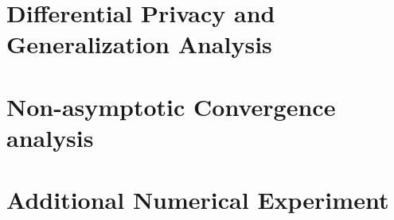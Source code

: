 %

\section{Differential Privacy and Generalization Analysis} \label{sec: pri}



\vspace{0.2in}

\section{Non-asymptotic Convergence analysis}


\vspace{0.2in}

\section{Additional Numerical Experiment}


%

%